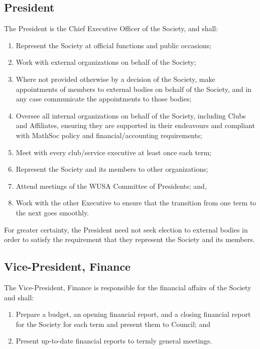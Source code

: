 \subsection{President}
The President is the Chief Executive Officer of the Society, and shall:
\begin{enumerate}
  \item Represent the Society at official functions and public occasions;
  \item Work with external organizations on behalf of the Society;
  \item Where not provided otherwise by a decision of the Society, make
    appointments of members to external bodies on behalf of the Society, and in
    any case communicate the appointments to those bodies;
    \item Oversee all internal organizations on behalf of the Society, including
        Clubs and Affiliates, ensuring they are supported in their endeavours and
        compliant with MathSoc policy and financial/accounting requirements;
    \item Meet with every club/service executive at least once each term;
  \item Represent the Society and its members to other organizations;
  \item Attend meetings of the WUSA Committee of Presidents; and,
  \item Work with the other Executive to ensure that the transition from one
    term to the next goes smoothly.
\end{enumerate}

For greater certainty, the President need not seek election to external bodies
in order to satisfy the requirement that they represent the Society and its
members.

\subsection{Vice-President, Finance}
The Vice-President, Finance is responsible for the financial affairs of the
Society and shall:
\begin{enumerate}
  \item Prepare a budget, an opening financial report, and a closing financial
    report for the Society for each term and present them to Council; and
  \item Present up-to-date financial reports to termly general meetings.
\end{enumerate}

